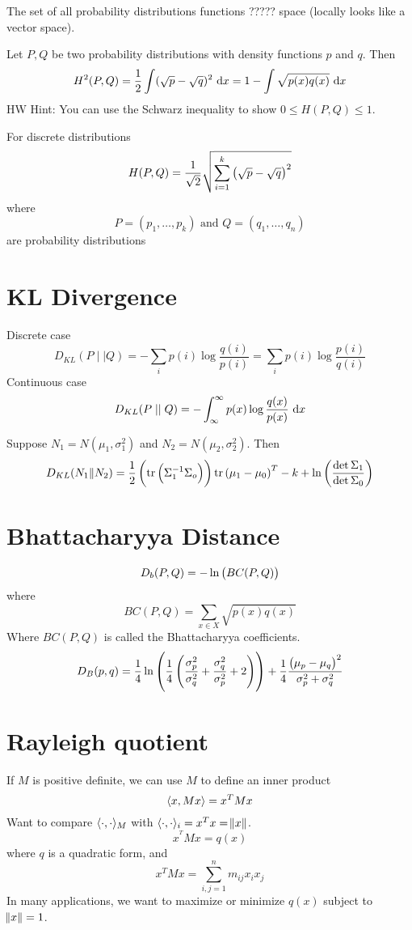 \documentclass{article}
\DeclareMathOperator{\trace}{tr}
\DeclarePairedDelimiter\ip{\langle }{\rangle}
\begin{document}
The set of all probability distributions functions ????? space (locally looks like a vector space).

Let \(P, Q\) be two probability distributions with density functions \(p\) and \(q\).
Then
\[H^2(P, Q) = \frac{1}{2}\int(\sqrt{p} - \sqrt{q})^2\,\dif x = 1 - \int \sqrt{p(x)q(x)}\,\dif x\]
HW Hint: You can use the Schwarz inequality to show \(0 \leq H(P, Q ) \leq 1\).

For discrete distributions
\[H(P, Q) = \frac{1}{\sqrt{2}} \sqrt{\sum_{i=1}^k \del{\sqrt{p} - \sqrt{q}}^2}\]
where
\[P = (p_1, \dots, p_k)\text{ and }Q = (q_1, \dots, q_n)\]
are probability distributions

\section{KL Divergence}
Discrete case
\[D_{KL} (P \mid\mid Q) = -\sum_i p(i) \log\frac{q(i)}{p(i)} =  \sum_i p(i) \log\frac{p(i)}{q(i)}\]
Continuous case
\[D_{KL} (P \mid\mid Q) = -\int_{\infty}^\infty p(x) \log\frac{q(x)}{p(x)}\,\dif x\]

Suppose \(N_1 = N(\mu_1, \sigma_1^2)\) and \(N_2 = N(\mu_2, \sigma_2^2)\).
Then
\[D_{KL}(N_1\| N_2) = \frac{1}{2}\del{\trace\del{\Sigma_1^{-1}\Sigma_o}}\trace\del{\mu_1 - \mu_0}^T-k + \ln\del{\frac{\det \Sigma_1}{\det \Sigma_0}}\]

\section{Bhattacharyya Distance}

\[D_b(P, Q) = -\ln\del{BC(P, Q)}\]
where
\[BC(P, Q) = \sum_{x \in X}\sqrt{p(x)q(x)}\]
Where \(BC(P, Q)\) is called the Bhattacharyya coefficients.
\[D_B(p, q) = \frac{1}{4}\ln\del{\frac{1}{4}\del{\frac{\sigma_p^2}{\sigma_q^2} + \frac{\sigma_q^2}{\sigma_p^2} + 2}} + \frac{1}{4} \frac{\del{\mu_p - \mu_q}^2}{\sigma_p^2 + \sigma_q^2}\]

\section{Rayleigh quotient}

If \(M\) is positive definite, we can use \(M\) to define an inner product
\[\ip{x, Mx} = x^TMx\]
Want to compare \(\ip{\cdot,\cdot}_M\) with \(\ip{\cdot, \cdot}_i = x^Tx = \norm{x}\).
\[x^^TMx = q(x)\]
where \(q\) is a quadratic form, and
\[x^TMx = \sum_{i, j = 1}^n m_{ij}x_ix_j\]
In many applications, we want to maximize or minimize \(q(x)\) subject to \(\norm{x} = 1\).
\end{document}
